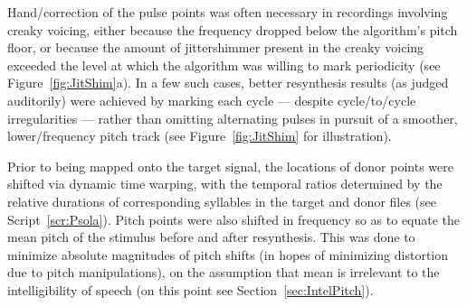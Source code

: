 Hand\-/correction of the pulse points was often necessary in recordings involving creaky voicing, either because the frequency dropped below the algorithm’s pitch floor, or because the amount of jitter\slsh{}shimmer present in the creaky voicing exceeded the level at which the algorithm was willing to mark periodicity (see Figure~\ref{fig:JitShim}a).  In a few such cases, better resynthesis results (as judged auditorily) were achieved by marking each cycle — despite cycle\-/to\-/cycle irregularities — rather than omitting alternating pulses in pursuit of a smoother, lower\-/frequency pitch track (see Figure~\ref{fig:JitShim} for illustration).  %

Prior to being mapped onto the target signal, the locations of donor \fo{} points were shifted via dynamic time warping, with the temporal ratios determined by the relative durations of corresponding syllables in the target and donor files (see Script~\ref{scr:Psola}).  Pitch points were also shifted in frequency so as to equate the mean pitch of the stimulus before and after resynthesis.  This was done to minimize absolute magnitudes of pitch shifts (in hopes of minimizing distortion due to pitch manipulations), on the assumption that mean \fo{} is irrelevant to the intelligibility of speech (on this point see Section~\ref{sec:IntelPitch}).

